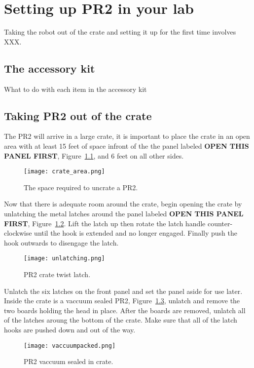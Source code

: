 \chapter{Setting up PR2 in your lab}
Taking the robot out of the crate and setting it up for the first time involves XXX.
\section{The accessory kit}
What to do with each item in the accessory kit
\section{Taking PR2 out of the crate}
The PR2 will arrive in a large crate, it is important to place the crate in an
open area with at least 15 feet of space infront of the the panel labeled {\bf
  OPEN THIS PANEL FIRST}, Figure~\ref{fig:crate_space}, and 6 feet on all other
sides.

\begin{figure}[h!]
\centering
\texttt{[image: crate\_area.png]}
\caption{The space required to uncrate a PR2.}
\label{fig:crate_space}
\end{figure}

Now that there is adequate room around the crate, begin opening the crate by
unlatching the metal latches around the panel labeled {\bf OPEN THIS PANEL
  FIRST}, Figure~\ref{fig:unlatch}. Lift the latch up then rotate the latch
handle counter-clockwise until the hook is extended and no longer
engaged. Finally push the hook outwards to disengage the latch.

\begin{figure}[h]
\centering
\texttt{[image: unlatching.png]}
\caption{PR2 crate twist latch.}
\label{fig:unlatch}
\end{figure}

Unlatch the six latches on the front panel and set the panel aside for use
later. Inside the crate is a vaccuum sealed PR2, Figure~\ref{fig:sealPR2},
unlatch and remove the two boards holding the head in place. After the boards
are removed, unlatch all of the latches aroung the bottom of the crate. Make
sure that all of the latch hooks are pushed down and out of the way.

\begin{figure}[h]
\centering
\texttt{[image: vaccuumpacked.png]}
\caption{PR2 vaccuum sealed in crate.}
\label{fig:sealPR2}
\end{figure}

